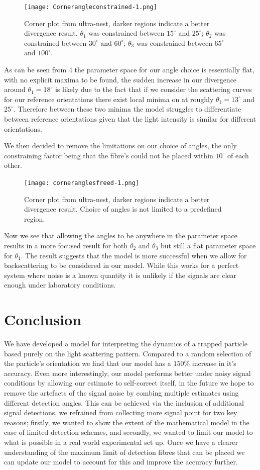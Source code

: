\documentclass[review,3p]{elsarticle}
\begin{document}
\begin{figure} [t]
	\centering
	\texttt{[image: Cornerangleconstrained-1.png]}
	\caption{Corner plot from ultra-nest, darker regions indicate a better divergence result. $\theta_1$ was constrained between $15^{\circ}$ and $25^{\circ}$; $\theta_2$ was constrained between $30^{\circ}$ and $60^{\circ}$; $\theta_3$ was constrained between $65^{\circ}$ and $100^{\circ}$.}
\end{figure}
As can be seen from \figurename{ 4} the parameter space for our angle choice is essentially flat, with no explicit maxima to be found, the sudden increase in our divergence around $\theta_1 = 18^{\circ}$ is likely due to the fact that if we consider the scattering curves for our reference orientations there exist local minima on at roughly $\theta_1 = 13^{\circ}$ and $25^{\circ}$. Therefore between these two minima the model struggles to differentiate between reference orientations given that the light intensity is similar for different orientations. 

We then decided to remove the limitations on our choice of angles, the only constraining factor being that the fibre's could not be placed within $10^{\circ}$ of each other. 

\begin{figure} [h]
	\centering
	\texttt{[image: corneranglesfreed-1.png]}
	\caption{Corner plot from ultra-nest, darker regions indicate a better divergence result. Choice of angles is not limited to a predefined region.}
\end{figure}

Now we see that allowing the angles to be anywhere in the parameter space results in a more focused result for both $\theta_2$ and $\theta_3$ but still a flat parameter space for $\theta_1$. The result suggests that the model is more successful when we allow for backscattering to be considered in our model. While this works for a perfect system where noise is a known quantity it is unlikely if the signals are clear enough under laboratory conditions.

	
\section{Conclusion}
\label{4}
We have developed a model for interpreting the dynamics of a trapped particle based purely on the light scattering pattern. Compared to a random selection of the particle's orientation we find that our model has a $150\%$ increase in it's accuracy. Even more interestingly, our model performs better under noisy signal conditions by allowing our estimate to self-correct itself, in the future we hope to remove the artefacts of the signal noise by combing multiple estimates using different detection angles. This can be achieved via the inclusion of additional signal detections, we refrained from collecting more signal point for two key reasons; firstly, we wanted to show the extent of the mathematical model in the case of limited detection schemes, and secondly, we wanted to limit our model to what is possible in a real world experimental set up. Once we have a clearer understanding of the maximum limit of detection fibres that can be placed we can update our model to account for this and improve the accuracy further. 
\end{document}
